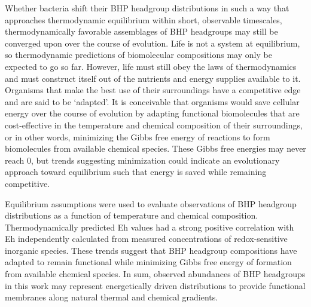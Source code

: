 Whether bacteria shift their BHP headgroup distributions in such a way that approaches thermodynamic equilibrium within short, observable timescales, thermodynamically favorable assemblages of BHP headgroups may still be converged upon over the course of evolution. Life is not a system at equilibrium, so thermodynamic predictions of biomolecular compositions may only be expected to go so far. However, life must still obey the laws of thermodynamics and must construct itself out of the nutrients and energy supplies available to it. Organisms that make the best use of their surroundings have a competitive edge and are said to be `adapted'. It is conceivable that organisms would save cellular energy over the course of evolution by adapting functional biomolecules that are cost-effective in the temperature and chemical composition of their surroundings, or in other words, minimizing the Gibbs free energy of reactions to form biomolecules from available chemical species. These Gibbs free energies may never reach 0, but trends suggesting minimization could indicate an evolutionary approach toward equilibrium such that energy is saved while remaining competitive.

Equilibrium assumptions were used to evaluate observations of BHP headgroup distributions as a function of temperature and chemical composition. Thermodynamically predicted Eh values had a strong positive correlation with Eh independently calculated from measured concentrations of redox-sensitive inorganic species. These trends suggest that BHP headgroup compositions have adapted to remain functional while minimizing Gibbs free energy of formation from available chemical species. In sum, observed abundances of BHP headgroups in this work may represent energetically driven distributions to provide functional membranes along natural thermal and chemical gradients.



